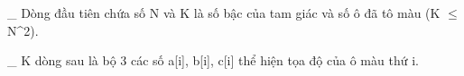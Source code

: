 \_ Dòng đầu tiên chứa số N và K là số bậc của tam giác và số ô đã tô màu (K  $\le$  N^2).  

   \_ K dòng sau là bộ 3 các số a[i], b[i], c[i] thể hiện tọa độ của ô màu thứ i.  

\